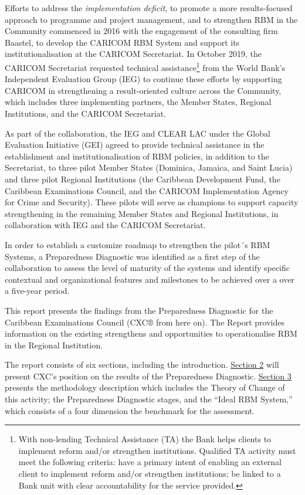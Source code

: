 \documentclass[
  10pt,
]{book}
\begin{document}
Efforts to address the \emph{implementation deficit}, to promote a more results-focused approach to programme and project management, and to strengthen RBM in the Community commenced in 2016 with the engagement of the consulting firm Baastel, to develop the CARICOM RBM System and support its institutionalisation at the CARICOM Secretariat. In October 2019, the CARICOM Secretariat requested technical assistance\footnote{With non-lending Technical Assistance (TA) the Bank helps clients to implement reform and/or strengthen institutions. Qualified TA activity must meet the following criteria: have a primary intent of enabling an external client to implement reform and/or strengthen institutions; be linked to a Bank unit with clear accountability for the service provided.} from the World Bank's Independent Evaluation Group (IEG) to continue these efforts by supporting CARICOM in strengthening a result-oriented culture across the Community, which includes three implementing partners, the Member States, Regional Institutions, and the CARICOM Secretariat.

As part of the collaboration, the IEG and CLEAR LAC under the Global Evaluation Initiative (GEI) agreed to provide technical assistance in the establishment and institutionalisation of RBM policies, in addition to the Secretariat, to three pilot Member States (Dominica, Jamaica, and Saint Lucia) and three pilot Regional Institutions (the Caribbean Development Fund, the Caribbean Examinations Council, and the CARICOM Implementation Agency for Crime and Security). These pilots will serve as champions to support capacity strengthening in the remaining Member States and Regional Institutions, in collaboration with IEG and the CARICOM Secretariat.

In order to establish a customize roadmap to strengthen the pilot´s RBM Systems, a Preparedness Diagnostic was identified as a first step of the collaboration to assess the level of maturity of the systems and identify specific contextual and organizational features and milestones to be achieved over a over a five-year period.

This report presents the findings from the Preparedness Diagnostic for the Caribbean Examinations Council (CXC® from here on). The Report provides information on the existing strengthens and opportunities to operationalise RBM in the Regional Institution.

The report consists of six sections, including the introduction. \protect\hyperlink{section2}{Section 2} will present CXC's position on the results of the Preparedness Diagnostic. \protect\hyperlink{section3}{Section 3} presents the methodology description which includes the Theory of Change of this activity; the Preparedness Diagnostic stages, and the ``Ideal RBM System,'' which consists of a four dimension the benchmark for the assessment.
\end{document}
